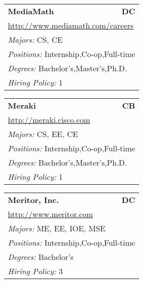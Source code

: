 \documentclass[twoside]{article}
\begin{document}
\begin{center}
\begin{multicols}{3}
\begin{FlushLeft}
\begin{minipage}{\columnwidth}
\end{minipage}
 
\begin{minipage}{\columnwidth}\begin{tabularx}{.95\columnwidth}{Xr}
                 {\Large\bf MediaMath} & {\Large\bf DC}\\
    \multicolumn{2}{p{.95\columnwidth}}{\url{http://www.mediamath.com/careers}}\\
    \multicolumn{2}{p{.95\columnwidth}}{\emph{Majors:} CS, CE}\\
    \multicolumn{2}{p{.95\columnwidth}}{\emph{Positions:} Internship,Co-op,Full-time}\\
    \multicolumn{2}{p{.95\columnwidth}}{\emph{Degrees:} Bachelor's,Master's,Ph.D.}\\
    \multicolumn{2}{p{.95\columnwidth}}{\emph{Hiring Policy:} 1}\\
    \end{tabularx}
    
\end{minipage}
 
\begin{minipage}{\columnwidth}\begin{tabularx}{.95\columnwidth}{Xr}
                 {\Large\bf Meraki} & {\Large\bf CB}\\
    \multicolumn{2}{p{.95\columnwidth}}{\url{http://meraki.cisco.com}}\\
    \multicolumn{2}{p{.95\columnwidth}}{\emph{Majors:} CS, EE, CE}\\
    \multicolumn{2}{p{.95\columnwidth}}{\emph{Positions:} Internship,Co-op,Full-time}\\
    \multicolumn{2}{p{.95\columnwidth}}{\emph{Degrees:} Bachelor's,Master's,Ph.D.}\\
    \multicolumn{2}{p{.95\columnwidth}}{\emph{Hiring Policy:} 1}\\
    \end{tabularx}
    
\end{minipage}
 
\begin{minipage}{\columnwidth}\begin{tabularx}{.95\columnwidth}{Xr}
                 {\Large\bf Meritor, Inc.} & {\Large\bf DC}\\
    \multicolumn{2}{p{.95\columnwidth}}{\url{http://www.meritor.com}}\\
    \multicolumn{2}{p{.95\columnwidth}}{\emph{Majors:} ME, EE, IOE, MSE}\\
    \multicolumn{2}{p{.95\columnwidth}}{\emph{Positions:} Internship,Co-op,Full-time}\\
    \multicolumn{2}{p{.95\columnwidth}}{\emph{Degrees:} Bachelor's}\\
    \multicolumn{2}{p{.95\columnwidth}}{\emph{Hiring Policy:} 3}\\
    \end{tabularx}
    

\end{minipage}
\end{FlushLeft}
\end{multicols}
\end{center}
\end{document}

